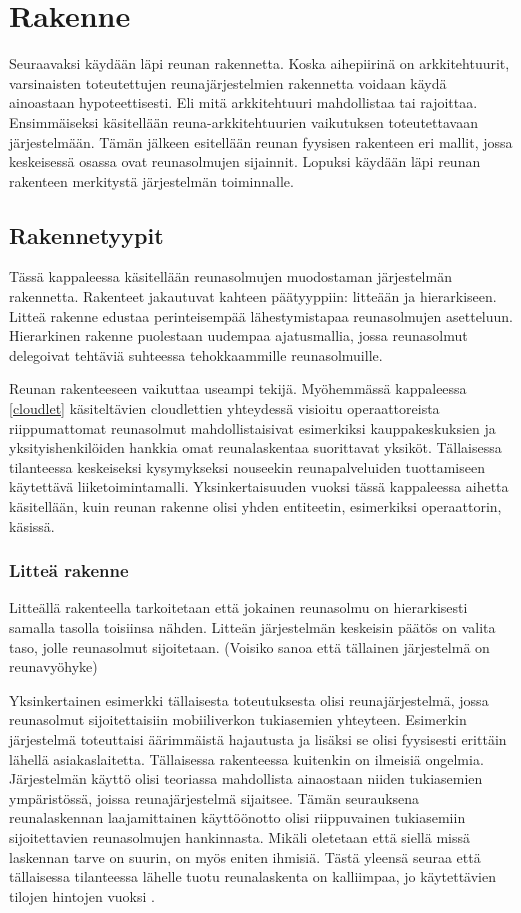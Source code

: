 \section{Rakenne}
Seuraavaksi käydään läpi reunan rakennetta. Koska aihepiirinä on arkkitehtuurit, varsinaisten toteutettujen reunajärjestelmien rakennetta voidaan käydä ainoastaan hypoteettisesti. 
Eli mitä arkkitehtuuri mahdollistaa tai rajoittaa.
Ensimmäiseksi käsitellään reuna-arkkitehtuurien vaikutuksen toteutettavaan järjestelmään.
Tämän jälkeen esitellään reunan fyysisen rakenteen eri mallit, jossa keskeisessä osassa ovat reunasolmujen sijainnit.
Lopuksi käydään läpi reunan rakenteen merkitystä järjestelmän toiminnalle.


\subsection{Rakennetyypit}
Tässä kappaleessa käsitellään reunasolmujen muodostaman järjestelmän rakennetta. Rakenteet jakautuvat kahteen päätyyppiin: litteään ja hierarkiseen.
Litteä rakenne edustaa perinteisempää lähestymistapaa reunasolmujen asetteluun. Hierarkinen rakenne puolestaan uudempaa ajatusmallia, jossa reunasolmut delegoivat tehtäviä suhteessa tehokkaammille reunasolmuille. 

Reunan rakenteeseen vaikuttaa useampi tekijä. Myöhemmässä kappaleessa \ref{cloudlet} käsiteltävien cloudlettien yhteydessä visioitu operaattoreista riippumattomat reunasolmut mahdollistaisivat esimerkiksi kauppakeskuksien ja yksityishenkilöiden hankkia omat reunalaskentaa suorittavat yksiköt. Tällaisessa tilanteessa keskeiseksi kysymykseksi nouseekin reunapalveluiden tuottamiseen käytettävä liiketoimintamalli. Yksinkertaisuuden vuoksi tässä kappaleessa aihetta käsitellään, kuin reunan rakenne olisi yhden entiteetin, esimerkiksi operaattorin, käsissä. 

\subsubsection{Litteä rakenne}
Litteällä rakenteella tarkoitetaan että jokainen reunasolmu on hierarkisesti samalla tasolla toisiinsa nähden. Litteän järjestelmän keskeisin päätös on valita taso, jolle reunasolmut sijoitetaan. (Voisiko sanoa että tällainen järjestelmä on reunavyöhyke)

Yksinkertainen esimerkki tällaisesta toteutuksesta olisi reunajärjestelmä, jossa reunasolmut sijoitettaisiin mobiiliverkon tukiasemien yhteyteen. Esimerkin järjestelmä  toteuttaisi äärimmäistä hajautusta ja lisäksi se olisi fyysisesti erittäin lähellä asiakaslaitetta. Tällaisessa rakenteessa kuitenkin on ilmeisiä ongelmia. Järjestelmän käyttö olisi teoriassa mahdollista ainaostaan niiden tukiasemien ympäristössä, joissa reunajärjestelmä sijaitsee. Tämän seurauksena reunalaskennan laajamittainen käyttöönotto olisi riippuvainen tukiasemiin sijoitettavien reunasolmujen hankinnasta. Mikäli oletetaan että siellä missä laskennan tarve on suurin, on myös eniten ihmisiä. Tästä yleensä seuraa että tällaisessa tilanteessa lähelle tuotu reunalaskenta on kalliimpaa, jo käytettävien tilojen hintojen vuoksi \cite{mao17}.

